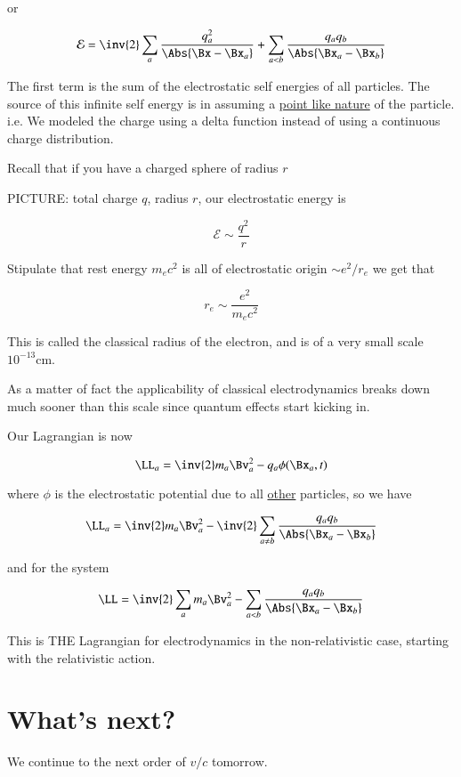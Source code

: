 or

\begin{equation}\label{eqn:relativisticElectrodynamicsL24:310}
\mathcal{E} = \inv{2} \sum_a \frac{q_a^2}{\Abs{\Bx - \Bx_a}} + \sum_{a < b} \frac{q_a q_b}{\Abs{\Bx_a - \Bx_b}}
\end{equation}

The first term is the sum of the electrostatic self energies of all particles.  The source of this infinite self energy is in assuming a \underline{point like nature} of the particle.  i.e.  We modeled the charge using a delta function instead of using a continuous charge distribution.

Recall that if you have a charged sphere of radius $r$

PICTURE: total charge $q$, radius $r$, our electrostatic energy is 

\begin{equation}\label{eqn:relativisticElectrodynamicsL24:330}
\mathcal{E} \sim \frac{q^2}{r}
\end{equation}

Stipulate that rest energy $m_e c^2$ is all of electrostatic origin $\sim e^2/r_e$ we get that 

\begin{equation}\label{eqn:relativisticElectrodynamicsL24:350}
r_e \sim \frac{e^2}{m_e c^2}
\end{equation}

This is called the classical radius of the electron, and is of a very small scale $10^{-13} \text{cm}$.

As a matter of fact the applicability of classical electrodynamics breaks down much sooner than this scale since quantum effects start kicking in.

Our Lagrangian is now

\begin{equation}\label{eqn:relativisticElectrodynamicsL24:370}
\LL_a = \inv{2} m_a \Bv_a^2 - q_a \phi(\Bx_a, t)
\end{equation}

where $\phi$ is the electrostatic potential due to all \underline{other} particles, so we have

\begin{equation}\label{eqn:relativisticElectrodynamicsL24:390}
\LL_a = \inv{2} m_a \Bv_a^2 - \inv{2} \sum_{a \ne b} \frac{q_a q_b }{\Abs{\Bx_a - \Bx_b}}
\end{equation}

and for the system

\begin{equation}\label{eqn:relativisticElectrodynamicsL24:410}
\LL = \inv{2} \sum_a m_a \Bv_a^2 - \sum_{a < b} \frac{q_a q_b }{\Abs{\Bx_a - \Bx_b}}
\end{equation}

This is THE Lagrangian for electrodynamics in the non-relativistic case, starting with the relativistic action.

\section{What's next?}

We continue to the next order of $v/c$ tomorrow.

\EndArticle
